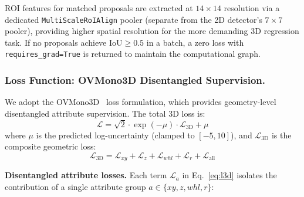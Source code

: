 \documentclass[runningheads]{llncs}
\begin{document}
ROI features for matched proposals are extracted at $14\times14$ resolution via a dedicated \texttt{MultiScaleRoIAlign} pooler (separate from the 2D detector's $7\times7$ pooler), providing higher spatial resolution for the more demanding 3D regression task.
If no proposals achieve $\text{IoU} \geq 0.5$ in a batch, a zero loss with \texttt{requires\_grad=True} is returned to maintain the computational graph.

\subsubsection{Loss Function: OVMono3D Disentangled Supervision.}
\label{sec:loss}

We adopt the OVMono3D~\cite{OVMono3D} loss formulation, which provides geometry-level disentangled attribute supervision.
The total 3D loss is:
\begin{equation}
    \mathcal{L} = \sqrt{2} \cdot \exp(-\mu) \cdot \mathcal{L}_{\text{3D}} + \mu
    \label{eq:total_loss}
\end{equation}
where $\mu$ is the predicted log-uncertainty (clamped to $[-5, 10]$), and $\mathcal{L}_{\text{3D}}$ is the composite geometric loss:
\begin{equation}
    \mathcal{L}_{\text{3D}} = \mathcal{L}_{xy} + \mathcal{L}_z + \mathcal{L}_{whl} + \mathcal{L}_r + \mathcal{L}_{\text{all}}
    \label{eq:l3d}
\end{equation}

\noindent\textbf{Disentangled attribute losses.}
Each term $\mathcal{L}_a$ in Eq.~\eqref{eq:l3d} isolates the contribution of a single attribute group $a \in \{xy, z, whl, r\}$:
\end{document}
